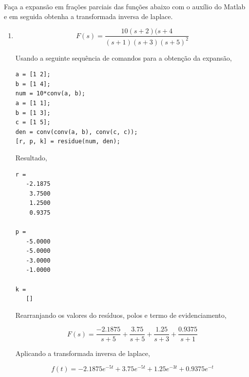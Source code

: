 \documentclass[a4paper, 10pt]{article}
\begin{document}


\begin{list}{\textbf{Questão .}}{
\setlength{\labelwidth}{-2mm} \setlength{\parsep}{0mm}
\setlength{\topsep}{0mm} \setlength{\leftmargin}{0mm}}
\renewcommand{\labelenumi}{(\alph{enumi})}

\item Faça a expansão em frações parciais das funções abaixo com o auxílio do Matlab
e em seguida obtenha a transformada inversa de laplace.
    \begin{enumerate}
        \item       
            $$ 
                F(s) = \frac{10(s+2)(s+4}{(s+1)(s+3)(s+5)^2}
            $$

Usando a seguinte sequência de comandos para a obtenção da expansão,
            \begin{lstlisting}
a = [1 2];
b = [1 4];
num = 10*conv(a, b);
a = [1 1];
b = [1 3];
c = [1 5];
den = conv(conv(a, b), conv(c, c));
[r, p, k] = residue(num, den);

            \end{lstlisting}


        Resultado,

        \begin{lstlisting}
r = 
   -2.1875 
    3.7500
    1.2500
    0.9375

p = 
   -5.0000
   -5.0000
   -3.0000
   -1.0000

k = 
   []

        \end{lstlisting}
        Rearranjando os valores do resíduos, polos e termo de evidenciamento,

            $$
                F(s) = \frac{-2.1875}{s+5} + \frac{3.75}{s+5} + \frac{1.25}{s+3} + \frac{0.9375}{s+1}
            $$

            Aplicando a transformada inversa de laplace,

            $$
            f(t) = -2.1875 e^{-5t} + 3.75 e^{-5t} + 1.25 e^{-3t} + 0.9375 e^{-t}
            $$
         



\end{enumerate}
\end{list}
\end{document}
